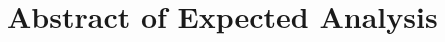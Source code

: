 \documentclass[11pt]{article}
\begin{document}
\section{Abstract of Expected Analysis}


\end{document}
